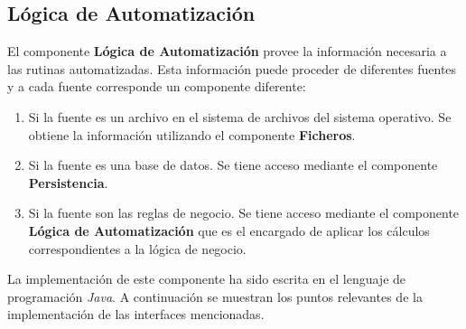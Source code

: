 \subsection{Lógica de Automatización}
El componente \textbf{Lógica de Automatización} provee la información necesaria a las rutinas automatizadas. Esta información puede proceder de diferentes fuentes y a cada fuente corresponde un componente diferente:
\begin{enumerate}
 	\item Si la fuente es un archivo en el sistema de archivos del sistema operativo. Se obtiene la información utilizando el componente \textbf{Ficheros}.
 	\item Si la fuente es una base de datos. Se tiene acceso mediante el componente \textbf{Persistencia}.
 	\item Si la fuente son las reglas de negocio. Se tiene acceso mediante el componente \textbf{Lógica de Automatización} que es el encargado de aplicar los cálculos correspondientes a la lógica de negocio.
\end{enumerate}
La implementación de este componente ha sido escrita en el lenguaje de programación \textit{Java}. A continuación se muestran los puntos relevantes de la implementación de las interfaces mencionadas.
